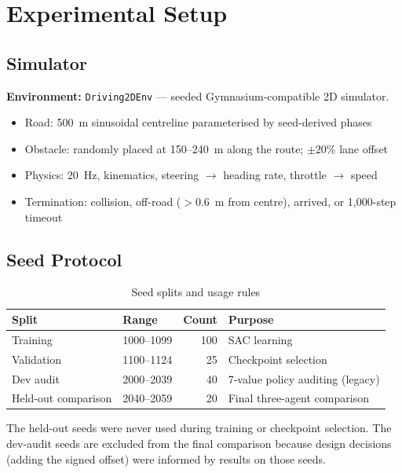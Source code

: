 \documentclass[12pt,a4paper]{report}
\begin{document}
\chapter{Experimental Setup}

\section{Simulator}

\textbf{Environment:} \texttt{Driving2DEnv} — seeded Gymnasium-compatible 2D simulator.
\begin{itemize}
  \item Road: 500~m sinusoidal centreline parameterised by seed-derived phases
  \item Obstacle: randomly placed at 150--240~m along the route; $\pm 20\%$ lane offset
  \item Physics: 20~Hz, kinematics, steering $\rightarrow$ heading rate, throttle $\rightarrow$ speed
  \item Termination: collision, off-road ($>0.6$~m from centre), arrived, or 1,000-step timeout
\end{itemize}

\section{Seed Protocol}

\begin{table}[H]
\centering
\caption{Seed splits and usage rules}
\label{tab:seeds}
\begin{tabular}{llrp{6cm}}
\toprule
Split & Range & Count & Purpose \\
\midrule
Training & 1000--1099 & 100 & SAC learning \\
Validation & 1100--1124 & 25 & Checkpoint selection \\
Dev audit & 2000--2039 & 40 & 7-value policy auditing (legacy) \\
Held-out comparison & 2040--2059 & 20 & Final three-agent comparison \\
\bottomrule
\end{tabular}
\end{table}

The held-out seeds were never used during training or checkpoint selection. The dev-audit seeds are excluded from the final comparison because design decisions (adding the signed offset) were informed by results on those seeds.
\end{document}
